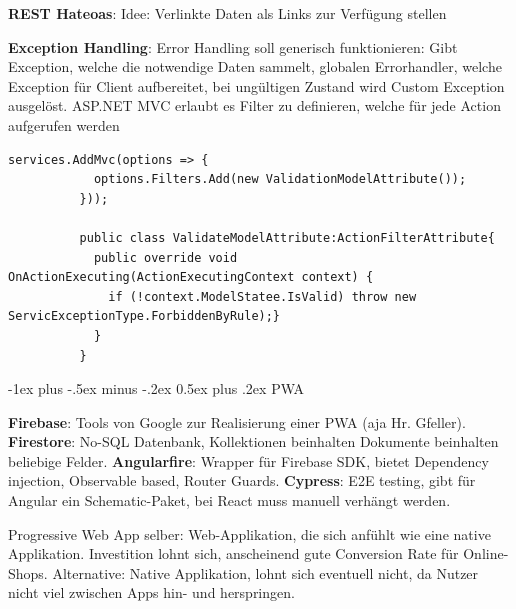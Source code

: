 \documentclass[10pt,landscape]{article}
\makeatletter
\renewcommand{\section}{\@startsection{section}{1}{0mm}%
{-1ex plus -.5ex minus -.2ex}%
{0.5ex plus .2ex}%
{\normalfont\large\bfseries}}
\makeatother
\begin{document}
\begin{multicols}{2}
        \textbf{REST Hateoas}: Idee: Verlinkte Daten als Links zur Verfügung stellen 

        \textbf{Exception Handling}: Error Handling soll generisch funktionieren: Gibt Exception, welche die notwendige Daten sammelt, globalen Errorhandler, welche Exception für Client aufbereitet, bei ungültigen Zustand wird Custom Exception ausgelöst.
        ASP.NET MVC erlaubt es Filter zu definieren, welche für jede Action aufgerufen werden 
        \begin{lstlisting}[style=CSharp]
          services.AddMvc(options => {
            options.Filters.Add(new ValidationModelAttribute());
          }));

          public class ValidateModelAttribute:ActionFilterAttribute{
            public override void OnActionExecuting(ActionExecutingContext context) {
              if (!context.ModelStatee.IsValid) throw new ServicExceptionType.ForbiddenByRule);}
            }
          }
        \end{lstlisting}
        
      

        \section{PWA}

        \textbf{Firebase}: Tools von Google zur Realisierung einer PWA (aja Hr. Gfeller).
        \textbf{Firestore}: No-SQL Datenbank, Kollektionen beinhalten Dokumente beinhalten beliebige Felder.
        \textbf{Angularfire}: Wrapper für Firebase SDK, bietet Dependency injection, Observable based, Router Guards.
        \textbf{Cypress}: E2E testing, gibt für Angular ein Schematic-Paket, bei React muss manuell verhängt werden.

        Progressive Web App selber: Web-Applikation, die sich anfühlt wie eine native Applikation.
        Investition lohnt sich, anscheinend gute Conversion Rate für Online-Shops.
        Alternative: Native Applikation, lohnt sich eventuell nicht, da Nutzer nicht viel zwischen Apps hin- und herspringen.


\end{multicols}
\end{document}
